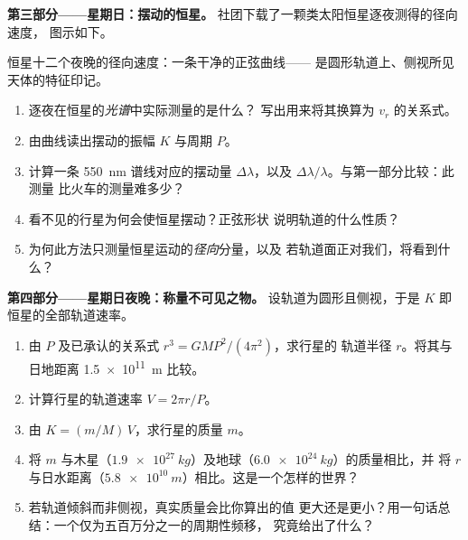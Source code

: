 \begin{problem}
\medskip
\noindent\textbf{第三部分——星期日：摆动的恒星。}
社团下载了一颗类太阳恒星逐夜测得的径向速度，
图示如下。

\begin{omfigure}

{\small 恒星十二个夜晚的径向速度：一条干净的正弦曲线——
是圆形轨道上、侧视所见天体的特征印记。}
\end{omfigure}

\begin{enumerate}[resume]
  \item 逐夜在恒星的\emph{光谱}中实际测量的是什么？
        写出用来将其换算为 $v_r$ 的关系式。
  \item 由曲线读出摆动的振幅 $K$ 与周期 $P$。
  \item 计算一条 \qty{550}{nm} 谱线对应的摆动量 $\Delta\lambda$，以及
        $\Delta\lambda/\lambda$。与第一部分比较：此测量
        比火车的测量难多少？
  \item 看不见的行星为何会使恒星摆动？正弦形状
        说明轨道的什么性质？
  \item 为何此方法只测量恒星运动的\emph{径向}分量，以及
        若轨道面正对我们，将看到什么？
\end{enumerate}

\medskip
\noindent\textbf{第四部分——星期日夜晚：称量不可见之物。}
设轨道为圆形且侧视，于是 $K$ 即恒星的全部轨道速率。
\begin{enumerate}[resume]
  \item 由 $P$ 及已承认的关系式 $r^3 = G M P^2/(4\pi^2)$，求行星的
        轨道半径 $r$。将其与日地距离 \qty{1.5e11}{m} 比较。
  \item 计算行星的轨道速率 $V = 2\pi r/P$。
  \item 由 $K = (m/M)\,V$，求行星的质量 $m$。
  \item 将 $m$ 与木星（$\qty{1.9e27}{kg}$）及地球（$\qty{6.0e24}{kg}$）的质量相比，并
        将 $r$ 与日水距离（$\qty{5.8e10}{m}$）相比。这是一个怎样的世界？
  \item 若轨道倾斜而非侧视，真实质量会比你算出的值
        更大还是更小？用一句话总结：一个仅为五百万分之一的周期性频移，
        究竟给出了什么？
\end{enumerate}
\end{problem}
